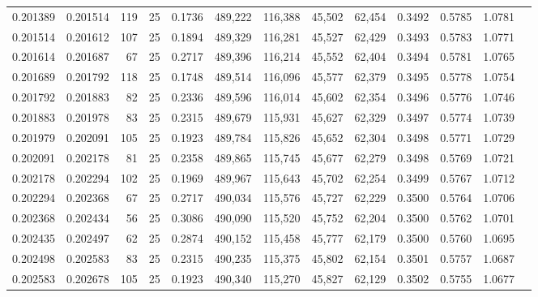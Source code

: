 \begin{tabular}{rrrrrrrrrrrrr}
0.201389 & 0.201514 &   119 &  25 &                                     0.1736 & 489,222 & 116,388 &  45,502 &  62,454 & 0.3492 & 0.5785 & 1.0781 \\
0.201514 & 0.201612 &   107 &  25 &                                     0.1894 & 489,329 & 116,281 &  45,527 &  62,429 & 0.3493 & 0.5783 & 1.0771 \\
0.201614 & 0.201687 &    67 &  25 &                                     0.2717 & 489,396 & 116,214 &  45,552 &  62,404 & 0.3494 & 0.5781 & 1.0765 \\
0.201689 & 0.201792 &   118 &  25 &                                     0.1748 & 489,514 & 116,096 &  45,577 &  62,379 & 0.3495 & 0.5778 & 1.0754 \\
0.201792 & 0.201883 &    82 &  25 &                                     0.2336 & 489,596 & 116,014 &  45,602 &  62,354 & 0.3496 & 0.5776 & 1.0746 \\
0.201883 & 0.201978 &    83 &  25 &                                     0.2315 & 489,679 & 115,931 &  45,627 &  62,329 & 0.3497 & 0.5774 & 1.0739 \\
0.201979 & 0.202091 &   105 &  25 &                                     0.1923 & 489,784 & 115,826 &  45,652 &  62,304 & 0.3498 & 0.5771 & 1.0729 \\
0.202091 & 0.202178 &    81 &  25 &                                     0.2358 & 489,865 & 115,745 &  45,677 &  62,279 & 0.3498 & 0.5769 & 1.0721 \\
0.202178 & 0.202294 &   102 &  25 &                                     0.1969 & 489,967 & 115,643 &  45,702 &  62,254 & 0.3499 & 0.5767 & 1.0712 \\
0.202294 & 0.202368 &    67 &  25 &                                     0.2717 & 490,034 & 115,576 &  45,727 &  62,229 & 0.3500 & 0.5764 & 1.0706 \\
0.202368 & 0.202434 &    56 &  25 &                                     0.3086 & 490,090 & 115,520 &  45,752 &  62,204 & 0.3500 & 0.5762 & 1.0701 \\
0.202435 & 0.202497 &    62 &  25 &                                     0.2874 & 490,152 & 115,458 &  45,777 &  62,179 & 0.3500 & 0.5760 & 1.0695 \\
0.202498 & 0.202583 &    83 &  25 &                                     0.2315 & 490,235 & 115,375 &  45,802 &  62,154 & 0.3501 & 0.5757 & 1.0687 \\
0.202583 & 0.202678 &   105 &  25 &                                     0.1923 & 490,340 & 115,270 &  45,827 &  62,129 & 0.3502 & 0.5755 & 1.0677 \\

\end{tabular}
